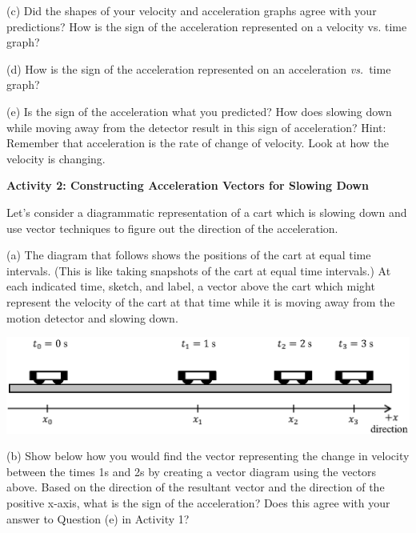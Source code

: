 (c) Did the shapes of your velocity and acceleration graphs agree with your
predictions? How is the sign of the acceleration represented on a velocity vs.
time graph? 
\answerspace{15mm}

(d) How is the sign of the acceleration represented on an acceleration \textit{vs.}~time
graph? 
\answerspace{15mm}

\pagebreak[3]
(e) Is the sign of the acceleration what you predicted? How does slowing down
while moving away from the detector result in this sign of acceleration? Hint:
Remember that acceleration is the rate of change of velocity. Look at how the
velocity is changing.
\answerspace{20mm}

\textbf{Activity 2: Constructing Acceleration Vectors for Slowing Down}

Let's consider a diagrammatic representation of a cart which is slowing down
and use vector techniques to figure out the direction of the acceleration.


(a) The diagram that follows shows the positions of the cart at equal time intervals.
(This is like taking snapshots of the cart at equal time intervals.) At each
indicated time, sketch, and label, a vector above the cart which might represent the velocity
of the cart at that time while it is moving away from the motion detector and
slowing down.

\vspace{0.5cm}
{\par\centering \includegraphics{slowing/carts_slowing.eps} \par}
\vspace{0.5cm}

(b) Show below how you would find the vector representing the change in velocity
between the times 1s and 2s by creating a vector diagram using the vectors 
 above. Based on the direction of the resultant vector and the direction of 
the positive x-axis, what is the sign of the acceleration? 
Does this agree with your answer to Question (e) in Activity 1?
\answerspace{25mm}

